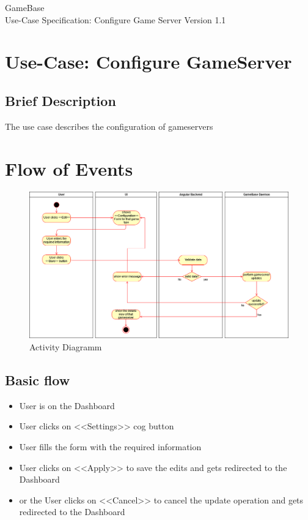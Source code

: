 \documentclass[a4paper,12pt,chapterprefix=false,bibliography=totoc,listof=totoc,]{scrreprt}
\begin{document}
\begin{flushright}
GameBase
\\
Use-Case Specification: Configure Game Server
\bigbreak
Version 1.1
\end{flushright}

\tableofcontents

\chapter{Use-Case: Configure GameServer}

\section{Brief Description}
The use case describes the configuration of gameservers

\chapter{Flow of Events}
\begin{figure}[H]
	\includegraphics[width=\textwidth]{diagramms/ConfigureGameserverActivityDiagramm.png}
	\caption{Activity Diagramm}
	\label{fig:ad}
\end{figure}

\section{Basic flow}

\begin{itemize}
    \item User is on the Dashboard
    \item User clicks on <<Settings>> cog button
    \item User fills the form with the required information
    \item User clicks on <<Apply>> to save the edits and gets redirected to the Dashboard
    \item or the User clicks on <<Cancel>> to cancel the update operation and gets redirected to the Dashboard
\end{itemize}
\end{document}
